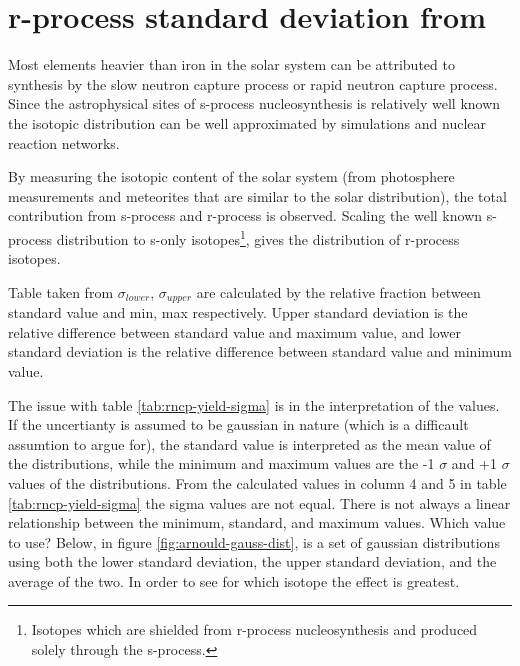 
\section{r-process standard deviation from \cite{arnould07}}
Most elements heavier than iron in the solar system can be attributed to synthesis by the slow neutron capture process or rapid neutron capture process. Since the astrophysical sites of s-process nucleosynthesis is relatively well known the isotopic distribution can be well approximated by simulations and nuclear reaction networks.

By measuring the isotopic content of the solar system (from photosphere measurements and meteorites that are similar to the solar distribution), the total contribution from s-process and r-process is observed. Scaling the well known s-process distribution to s-only isotopes\footnote{Isotopes which are shielded from r-process nucleosynthesis and produced solely through the s-process.}, gives the distribution of r-process isotopes.

\begin{table}
  
  \caption{\label{tab:rncp-yield-sigma}
    Table taken from \cite[table 1]{arnould07}
    $\sigma_{lower}$, $\sigma_{upper}$ are calculated by the relative fraction between standard value and min, max respectively.
    Upper standard deviation is the relative difference between standard value and maximum value, and lower standard deviation is the relative difference between standard value and minimum value.
  }
\end{table}
\FloatBarrier

The issue with table \ref{tab:rncp-yield-sigma} is in the interpretation of the values. If the uncertianty is assumed to be gaussian in nature (which is a difficault assumtion to argue for), the standard value is interpreted as the mean value of the distributions, while the minimum and maximum values are the -1 $\sigma$ and +1 $\sigma$ values of the distributions. From the calculated values in column 4 and 5 in table \ref{tab:rncp-yield-sigma} the sigma values are not equal. There is not always a linear relationship between the minimum, standard, and maximum values.
Which value to use? Below, in figure \ref{fig:arnould-gauss-dist}, is a set of gaussian distributions using both  the lower standard deviation, the upper standard deviation, and the average of the two.
In order to see for which isotope the effect is greatest.

